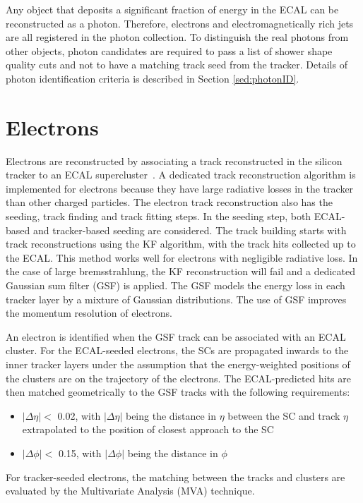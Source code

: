 \documentclass[thesis.tex]{subfiles}
\begin{document}
Any object that deposits a significant fraction of energy in the ECAL can be reconstructed as a photon.
Therefore, electrons and electromagnetically rich jets are all registered in the photon collection. 
To distinguish the real photons from other objects, photon candidates are required to pass a list of shower shape quality cuts and not to have a matching track seed from the tracker. 
Details of photon identification criteria is described in Section \ref{sed:photonID}.

\section{Electrons}

Electrons are reconstructed by associating a track reconstructed in the silicon tracker to an ECAL supercluster~\cite{ElectronPF}.
A dedicated track reconstruction algorithm is implemented for electrons because they have large radiative losses in the tracker than other charged particles.
The electron track reconstruction also has the seeding, track finding and track fitting steps. 
In the seeding step, both ECAL-based and tracker-based seeding are considered. 
The track building starts with track reconstructions using the KF algorithm, with the track hits collected up to the ECAL. 
This method works well for electrons with negligible radiative loss. 
In the case of large bremsstrahlung, the KF reconstruction will fail and a dedicated Gaussian sum filter (GSF) is applied. 
The GSF models the energy loss in each tracker layer by a mixture of Gaussian distributions.
The use of GSF improves the momentum resolution of electrons. 

An electron is identified when the GSF track can be associated with an ECAL cluster. 
For the ECAL-seeded electrons, the SCs are propagated inwards to the inner tracker layers under the assumption that the energy-weighted positions of the clusters are on the trajectory of the electrons. 
The ECAL-predicted hits are then matched geometrically to the GSF tracks with the following requirements: 
\begin{itemize}
	\item $|\Delta\eta| < $ 0.02, with $|\Delta\eta|$ being the distance in $\eta$ between the SC and track $\eta$ extrapolated to the position of closest approach to the SC
	\item $|\Delta\phi| < $ 0.15, with  $|\Delta\phi|$ being the distance in $\phi$
\end{itemize}
For tracker-seeded electrons, the matching between the tracks and clusters are evaluated by the Multivariate Analysis (MVA) technique. 
\end{document}
